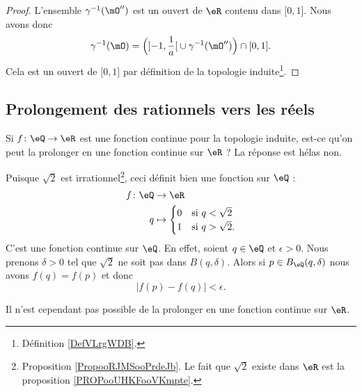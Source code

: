 \begin{proof}
	L'ensemble \( \gamma^{-1}(\mO'')\) est un ouvert de \( \eR\) contenu dans \( \mathopen[ 0 , 1 \mathclose]\). Nous avons donc
	\begin{equation}
		\gamma^{-1}(\mO)=\Big( \mathopen] -1 , \frac{1}{ a } \mathclose[\cup\gamma^{-1}(\mO'') \Big)\cap \mathopen[ 0 , 1 \mathclose].
	\end{equation}
	Cela est un ouvert de \( \mathopen[ 0 , 1 \mathclose]\) par définition de la topologie induite\footnote{Définition \ref{DefVLrgWDB}.}.
\end{proof}

\subsection{Prolongement des rationnels vers les réels}

Si \( f\colon \eQ\to \eR\) est une fonction continue pour la topologie induite, est-ce qu'on peut la prolonger en une fonction continue sur \( \eR\) ? La réponse est hélas non.

\begin{example}       \label{EXooWZNCooQkKdtJ}
	Puisque \( \sqrt{ 2 }\) est irrationnel\footnote{Proposition \ref{PropooRJMSooPrdeJb}. Le fait que \( \sqrt{ 2 }\) existe dans \( \eR\) est la proposition \ref{PROPooUHKFooVKmpte}.}, ceci définit bien une fonction sur \( \eQ\) :
	\begin{equation}
		\begin{aligned}
			f\colon \eQ & \to \eR                              \\
			q           & \mapsto \begin{cases}
				                      0 & \text{si } q<\sqrt{ 2 }  \\
				                      1 & \text{si } q>\sqrt{ 2 }.
			                      \end{cases}
		\end{aligned}
	\end{equation}
	C'est une fonction continue sur \( \eQ\). En effet, soient \( q\in \eQ\) et \( \epsilon>0\). Nous prenons \( \delta>0\) tel que \( \sqrt{ 2 }\) ne soit pas dans \( B(q,\delta)\). Alors si \( p\in B_{\eQ}(q,\delta)\) nous avons \( f(q)=f(p)\) et donc
	\begin{equation}
		| f(p)-f(q) |<\epsilon.
	\end{equation}

	Il n'est cependant pas possible de la prolonger en une fonction continue sur \( \eR\).
\end{example}

